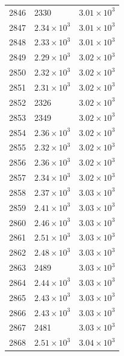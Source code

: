 \begin{table}[H]
\begin{tabular}{lll}
2846 & 2330 & $\displaystyle 3.01 \times 10^{3}$ \\
2847 & $\displaystyle 2.34 \times 10^{3}$ & $\displaystyle 3.01 \times 10^{3}$ \\
2848 & $\displaystyle 2.33 \times 10^{3}$ & $\displaystyle 3.01 \times 10^{3}$ \\
2849 & $\displaystyle 2.29 \times 10^{3}$ & $\displaystyle 3.02 \times 10^{3}$ \\
2850 & $\displaystyle 2.32 \times 10^{3}$ & $\displaystyle 3.02 \times 10^{3}$ \\
2851 & $\displaystyle 2.31 \times 10^{3}$ & $\displaystyle 3.02 \times 10^{3}$ \\
2852 & 2326 & $\displaystyle 3.02 \times 10^{3}$ \\
2853 & 2349 & $\displaystyle 3.02 \times 10^{3}$ \\
2854 & $\displaystyle 2.36 \times 10^{3}$ & $\displaystyle 3.02 \times 10^{3}$ \\
2855 & $\displaystyle 2.32 \times 10^{3}$ & $\displaystyle 3.02 \times 10^{3}$ \\
2856 & $\displaystyle 2.36 \times 10^{3}$ & $\displaystyle 3.02 \times 10^{3}$ \\
2857 & $\displaystyle 2.34 \times 10^{3}$ & $\displaystyle 3.02 \times 10^{3}$ \\
2858 & $\displaystyle 2.37 \times 10^{3}$ & $\displaystyle 3.03 \times 10^{3}$ \\
2859 & $\displaystyle 2.41 \times 10^{3}$ & $\displaystyle 3.03 \times 10^{3}$ \\
2860 & $\displaystyle 2.46 \times 10^{3}$ & $\displaystyle 3.03 \times 10^{3}$ \\
2861 & $\displaystyle 2.51 \times 10^{3}$ & $\displaystyle 3.03 \times 10^{3}$ \\
2862 & $\displaystyle 2.48 \times 10^{3}$ & $\displaystyle 3.03 \times 10^{3}$ \\
2863 & 2489 & $\displaystyle 3.03 \times 10^{3}$ \\
2864 & $\displaystyle 2.44 \times 10^{3}$ & $\displaystyle 3.03 \times 10^{3}$ \\
2865 & $\displaystyle 2.43 \times 10^{3}$ & $\displaystyle 3.03 \times 10^{3}$ \\
2866 & $\displaystyle 2.43 \times 10^{3}$ & $\displaystyle 3.03 \times 10^{3}$ \\
2867 & 2481 & $\displaystyle 3.03 \times 10^{3}$ \\
2868 & $\displaystyle 2.51 \times 10^{3}$ & $\displaystyle 3.04 \times 10^{3}$ \\

\end{tabular}
\end{table}
